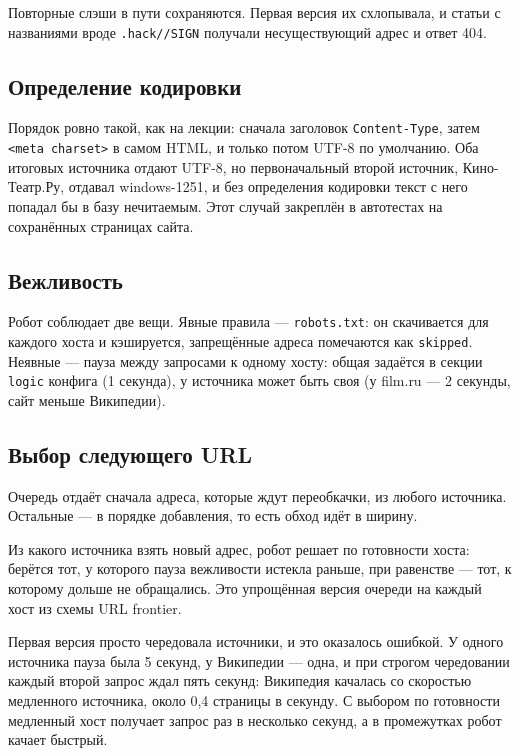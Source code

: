 Повторные слэши в пути сохраняются. Первая версия их схлопывала, и статьи с
названиями вроде \texttt{.hack//SIGN} получали несуществующий адрес и ответ 404.

\subsection*{Определение кодировки}

Порядок ровно такой, как на лекции: сначала заголовок \texttt{Content-Type},
затем \texttt{<meta charset>} в самом HTML, и только потом UTF-8 по умолчанию.
Оба итоговых источника отдают UTF-8, но первоначальный второй источник,
Кино-Театр.Ру, отдавал windows-1251, и без определения кодировки текст с него
попадал бы в базу нечитаемым. Этот случай закреплён в автотестах на сохранённых
страницах сайта.

\subsection*{Вежливость}

Робот соблюдает две вещи. Явные правила --- \texttt{robots.txt}: он скачивается
для каждого хоста и кэшируется, запрещённые адреса помечаются как
\texttt{skipped}. Неявные --- пауза между запросами к одному хосту: общая
задаётся в секции \texttt{logic} конфига (1 секунда), у источника может быть
своя (у film.ru --- 2 секунды, сайт меньше Википедии).

\subsection*{Выбор следующего URL}

Очередь отдаёт сначала адреса, которые ждут переобкачки, из любого источника.
Остальные --- в порядке добавления, то есть обход идёт в ширину.

Из какого источника взять новый адрес, робот решает по готовности хоста:
берётся тот, у которого пауза вежливости истекла раньше, при равенстве --- тот,
к которому дольше не обращались. Это упрощённая версия очереди на каждый хост
из схемы URL frontier.

Первая версия просто чередовала источники, и это оказалось ошибкой. У одного
источника пауза была 5 секунд, у Википедии --- одна, и при строгом чередовании
каждый второй запрос ждал пять секунд: Википедия качалась со скоростью
медленного источника, около 0,4 страницы в секунду. С выбором по готовности
медленный хост получает запрос раз в несколько секунд, а в промежутках робот
качает быстрый.

